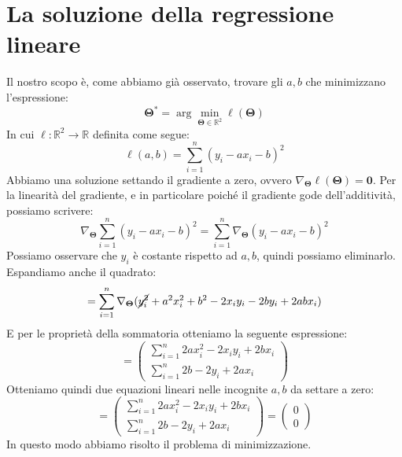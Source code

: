 \documentclass{article}
\begin{document}
    \section{La soluzione della regressione lineare}
        Il nostro scopo è, come abbiamo già osservato, trovare gli $a,b$ che minimizzano l'espressione:
            \[\mathbf{\Theta}^* = \arg \min_{\mathbf{\Theta} \in \mathbb{R}^2} \ell(\mathbf{\Theta})\]
        In cui $\ell:\mathbb{R}^2 \to \mathbb{R}$ definita come segue:
            \[\ell(a,b) = \sum_{i=1}^n (y_i - ax_i - b)^2 \]
        Abbiamo una soluzione settando il gradiente a zero, ovvero  $\nabla_{\mathbf{\Theta}} \ell(\mathbf{\Theta}) = \mathbf{0}$.
        Per la linearità del gradiente, e in particolare poiché il gradiente gode dell'additività, possiamo scrivere:
            \[\nabla_{\mathbf{\Theta}}\sum_{i=1}^n (y_i - ax_i - b)^2 = \sum_{i=1}^n \nabla_{\mathbf{\Theta}} (y_i - ax_i - b)^2\]
        Possiamo osservare che $y_i$ è costante rispetto ad $a,b$, quindi possiamo eliminarlo. Espandiamo anche il quadrato:
            \[= \sum_{i=1}^n \nabla_{\mathbf{\Theta}} (\cancel{y_i^2} + a^2x^2_i + b^2 - 2x_iy_i - 2by_i + 2abx_i) \]
        E per le proprietà della sommatoria otteniamo la seguente espressione:
            \begin{equation} 
                = \begin{pmatrix} \sum_{i=1}^n 2ax_i^2 - 2x_iy_i + 2bx_i \\
                \sum_{i=1}^n 2b - 2y_i + 2ax_i \end{pmatrix}
            \end{equation}
        Otteniamo quindi due equazioni lineari nelle incognite $a,b$ da settare a zero:
        \begin{equation} 
            = \begin{pmatrix} \sum_{i=1}^n 2ax_i^2 - 2x_iy_i + 2bx_i \\
            \sum_{i=1}^n 2b - 2y_i + 2ax_i \end{pmatrix} 
            = \begin{pmatrix}
                0 \\
                0
            \end{pmatrix}
        \end{equation}
        In questo modo abbiamo risolto il problema di minimizzazione.
\end{document}
